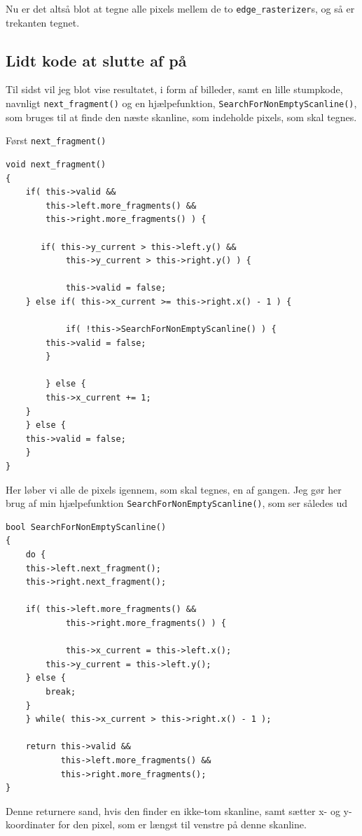 \documentclass[a4paper, 10pt]{article}
\begin{document}
Nu er det altså blot at tegne alle pixels mellem de to \texttt{edge\_rasterizer}s, og så er trekanten tegnet.

\subsection{Lidt kode at slutte af på}
Til sidst vil jeg blot vise resultatet, i form af billeder, samt en lille stumpkode, navnligt \texttt{next\_fragment()} og en hjælpefunktion, \texttt{SearchForNonEmptyScanline()}, som bruges til at finde den næste skanline, som indeholde pixels, som skal tegnes.

Først \texttt{next\_fragment()}
\begin{lstlisting}
void next_fragment()    
{
    if( this->valid && 
        this->left.more_fragments() && 
        this->right.more_fragments() ) {
	
       if( this->y_current > this->left.y() && 
            this->y_current > this->right.y() ) {
	    
            this->valid = false;
	} else if( this->x_current >= this->right.x() - 1 ) {
	    
            if( !this->SearchForNonEmptyScanline() ) {
		this->valid = false;
	    }
	
        } else {
	    this->x_current += 1;
	}
    } else {
	this->valid = false; 
    }
}
\end{lstlisting} 

Her løber vi alle de pixels igennem, som skal tegnes, en af gangen.
Jeg gør her brug af min hjælpefunktion \texttt{SearchForNonEmptyScanline()}, som ser således ud
\pagebreak
\begin{lstlisting}
bool SearchForNonEmptyScanline()
{
    do {
	this->left.next_fragment();
	this->right.next_fragment();

	if( this->left.more_fragments() && 
            this->right.more_fragments() ) {
	    
            this->x_current = this->left.x();
	    this->y_current = this->left.y();
	} else {
	    break;
	}
    } while( this->x_current > this->right.x() - 1 );

    return this->valid && 
           this->left.more_fragments() && 
           this->right.more_fragments();
}
\end{lstlisting}

Denne returnere sand, hvis den finder en ikke-tom skanline, samt sætter x- og y-koordinater for den pixel, som er længst til venstre på denne skanline.
\end{document}
